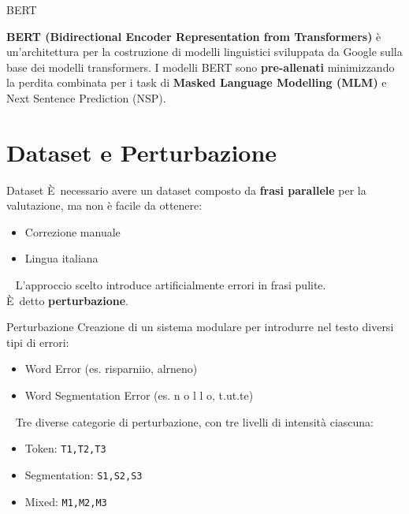 \documentclass{beamer}
\newcommand{\E}{È}
\begin{document}
\begin{frame}{BERT}
	
\textbf{BERT (Bidirectional Encoder Representation from Transformers)} è un'architettura per la costruzione di modelli linguistici sviluppata da Google sulla base dei modelli transformers.
\newline \newline
I modelli BERT sono \textbf{pre-allenati} minimizzando la perdita combinata per i task di \textbf{Masked Language Modelling (MLM)} e Next Sentence Prediction (NSP).
	
\end{frame}

\section{Dataset e Perturbazione}

\begin{frame}{Dataset}
\E\ necessario avere un dataset composto da \textbf{frasi parallele} per la valutazione, ma non è facile da ottenere:
\begin{itemize}
\item Correzione manuale
\item Lingua italiana
\end{itemize}\ 
\newline \newline
L'approccio scelto introduce artificialmente errori in frasi pulite.\\ \E\ detto \textbf{perturbazione}.
\end{frame}

\begin{frame}{Perturbazione}
Creazione di un sistema modulare per introdurre nel testo diversi tipi di errori:
\begin{itemize}
\item Word Error (es. risparniio, alrneno) 
\item Word Segmentation Error (es. n o l l o, t.ut.te)
\end{itemize}\
\newline
Tre diverse categorie di perturbazione, con tre livelli di intensità ciascuna:
\begin{itemize}
\item Token: \texttt{T1,T2,T3}
\item Segmentation: \texttt{S1,S2,S3}
\item Mixed: \texttt{M1,M2,M3}

\end{itemize}
\end{frame}
\end{document}
